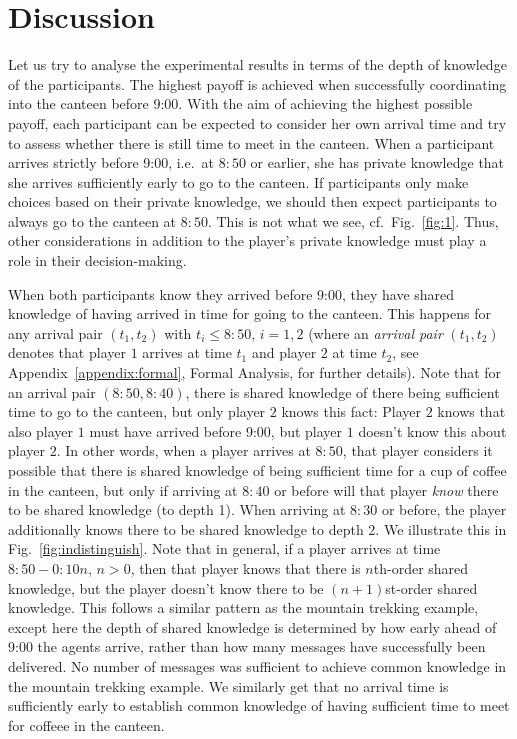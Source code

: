 \documentclass[twocolumn,a4paper,superscriptaddress,nofootinbib]{revtex4}
\begin{document}
\section{Discussion}\label{discussion}
Let us try to analyse the experimental results in terms of the depth of knowledge of the participants. The highest payoff is achieved when successfully coordinating into the canteen before 9:00. With the aim of achieving the highest possible payoff, each participant can be expected to consider her own arrival time and try to assess whether there is still time to meet in the canteen. When a participant arrives strictly before 9:00, i.e.\ at $8{:}50$ or earlier, she has private knowledge that she arrives sufficiently early to go to the canteen. If participants only make choices based on their private knowledge, we should then expect participants to always go to the canteen at $8{:}50$. This is not what we see, cf.\ Fig.~\ref{fig:1}. Thus, other considerations in addition to the player's private knowledge must play a role in their decision-making.

When both participants know they arrived before 9:00, they have shared knowledge of having arrived in time for going to the canteen. This happens for any arrival pair $(t_1,t_2)$ with $t_i \leq 8{:}50$, $i=1,2$ (where an \emph{arrival pair} $(t_1,t_2)$ denotes that player $1$ arrives at time $t_1$ and player $2$ at time $t_2$, see Appendix~\ref{appendix:formal}, Formal Analysis, for further details). Note that for an arrival pair $(8{:}50,8{:}40)$, there is shared knowledge of there being sufficient time to go to the canteen, but only player $2$ knows this fact: Player $2$ knows that also player $1$ must have arrived before 9{:}00, but player $1$ doesn't know this about player $2$. In other words, when a player arrives at $8{:}50$, that player considers it possible that there is shared knowledge of being sufficient time for a cup of coffee in the canteen, but only if arriving at $8{:}40$ or before will that player \emph{know} there to be shared knowledge (to depth 1). When arriving at $8{:}30$ or before, the player additionally knows there to be shared knowledge to depth 2. We illustrate this in Fig.~\ref{fig:indistinguish}. Note that in general, if a player arrives at time $8{:}50-0{:}10n$, $n>0$, then that player knows that there is $n$th-order shared knowledge, but the player doesn't know there to be $(n+1)$st-order shared knowledge. This follows a similar pattern as the mountain trekking example, except here the depth of shared knowledge is determined by how early ahead of 9:00 the agents arrive, rather than how many messages have successfully been delivered. No number of messages was sufficient to achieve common knowledge in the mountain trekking example. We similarly get that no arrival time is sufficiently early to establish common knowledge of having sufficient time to meet for coffeee in the canteen. 
\end{document}
